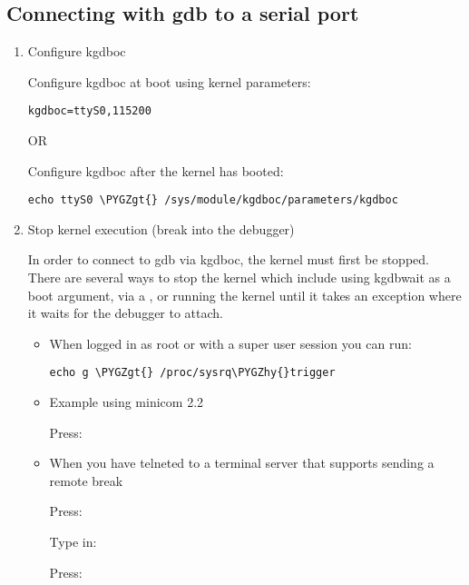 \documentclass[a4paper,8pt,english]{sphinxmanual}
\def\PYGZgt{\char`\>}
\def\PYGZhy{\char`\-}
\begin{document}
\subsection{Connecting with gdb to a serial port}
\label{dev-tools/kgdb:connecting-with-gdb-to-a-serial-port}\begin{enumerate}
\item {} 
Configure kgdboc

Configure kgdboc at boot using kernel parameters:

\begin{Verbatim}[commandchars=\\\{\}]
kgdboc=ttyS0,115200
\end{Verbatim}

OR

Configure kgdboc after the kernel has booted:

\begin{Verbatim}[commandchars=\\\{\}]
echo ttyS0 \PYGZgt{} /sys/module/kgdboc/parameters/kgdboc
\end{Verbatim}

\item {} 
Stop kernel execution (break into the debugger)

In order to connect to gdb via kgdboc, the kernel must first be
stopped. There are several ways to stop the kernel which include
using kgdbwait as a boot argument, via a , or running the
kernel until it takes an exception where it waits for the debugger to
attach.
\begin{itemize}
\item {} 
When logged in as root or with a super user session you can run:

\begin{Verbatim}[commandchars=\\\{\}]
echo g \PYGZgt{} /proc/sysrq\PYGZhy{}trigger
\end{Verbatim}

\item {} 
Example using minicom 2.2

Press:   

\item {} 
When you have telneted to a terminal server that supports sending
a remote break

Press: \sphinxcode{CTRL-{]}}

Type in: 

Press:  


\end{itemize}
\end{enumerate}
\end{document}
